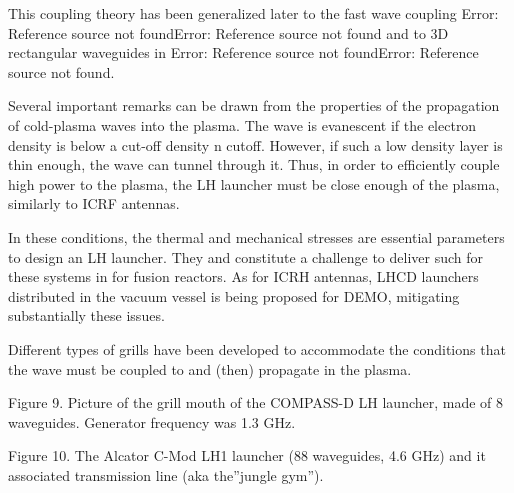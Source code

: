 This coupling theory has been generalized later to the fast wave coupling Error: Reference source not foundError: Reference source not found and to 3D rectangular waveguides in Error: Reference source not foundError: Reference source not found. 

Several important remarks can be drawn from the properties of the propagation of cold-plasma waves into the plasma. The wave is evanescent if the electron density is below a cut-off density n cutoff. However, if such a low density layer is thin enough, the wave can tunnel through it. Thus, in order to efficiently couple high power to the plasma, the LH launcher must be close enough of the plasma, similarly to ICRF antennas. 

In these conditions, the thermal and mechanical stresses are essential parameters to design an LH launcher. They and constitute a challenge to deliver such for these systems in for fusion reactors. As for ICRH antennas, LHCD launchers distributed in the vacuum vessel is being proposed for DEMO, mitigating substantially these issues.

Different types of grills have been developed to accommodate the conditions that the wave must be coupled to and (then) propagate in the plasma. 


Figure 9. Picture of the grill mouth of the COMPASS-D LH launcher, made of 8 waveguides. Generator frequency was 1.3 GHz.


Figure 10. The Alcator C-Mod LH1 launcher (88 waveguides, 4.6 GHz) and it associated transmission line (aka the”jungle gym”). 

